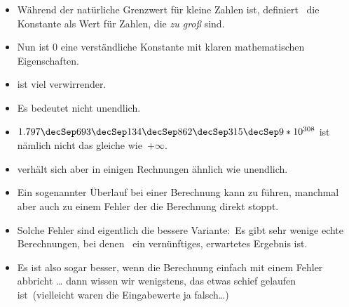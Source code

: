 \documentclass[aspectratio=169,mathserif,notheorems]{beamer}%
\begin{document}
\begin{frame}[t]
\begin{itemize}
{}%
%
%
%
\item<39-> Während  der natürliche Grenzwert für kleine Zahlen ist, definiert \python\ die Konstante  als Wert für Zahlen, die \emph{zu groß} sind.%
%
\item<40-> Nun ist 0 eine verständliche Konstante mit klaren mathematischen Eigenschaften.%
%
\item<41->  ist viel verwirrender.%
%
\item<42-> Es bedeutet \alert{nicht} unendlich.%
%
\item<43-> $1.797\decSep693\decSep134\decSep862\decSep315\decSep9*10^{308}$ ist nämlich nicht das gleiche wie~$+\infty$.%
%
\item<44->  verhält sich aber in einigen Rechnungen ähnlich wie unendlich.%
%
\item<45-> Ein sogenannter Überlauf bei einer Berechnung kann zu  führen, manchmal aber auch zu einem Fehler der die Berechnung direkt stoppt.%
%
\item<46-> Solche Fehler sind eigentlich die bessere Variante:~Es gibt sehr wenige echte Berechnungen, bei denen~ ein vernünftiges, erwartetes Ergebnis ist.%
%
\item<47-> Es ist also sogar besser, wenn die Berechnung einfach mit einem Fehler abbricht {\dots} dann wissen wir wenigstens, das etwas schief gelaufen ist~(vielleicht waren die Eingabewerte ja falsch\dots)%
%
\end{itemize}%
%
%
%
%
%
%
%
%
%

\end{frame}
\end{document}
